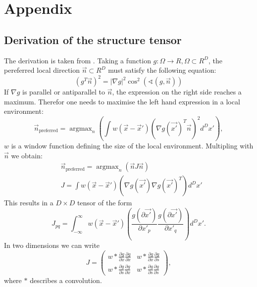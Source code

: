 \documentclass  [
  paper    = a4,
  BCOR     = 10mm,
  twoside,
  fontsize = 12pt,
  fleqn,
  toc      = bibnumbered,
  toc      = listofnumbered,
  numbers  = noendperiod,
  headings = normal,
  listof   = leveldown,
  version  = 3.03
]                                       {scrreprt}
\DeclareMathOperator*{\argmax}{argmax}
\begin{document}
  \part{Appendix}
  \begin{appendix}
  	\chapter{Derivation of the structure tensor}
  	The derivation is taken from \cite{jahne2013digitale}. Taking a function $g:\Omega\rightarrow \!R, \Omega \subset \!R^D$, the pereferred local direction $\vec{n} \subset \!R^D$ must satisfy the following equation:
  	\begin{equation}\label{key}
  	( g^T\vec{n})^2 = |\nabla g |^2 \cos^2(\sphericalangle (g, \vec{n}))
  	\end{equation}
  	If $\nabla g$ is parallel or antiparallel to $\vec{n}$, the expression on the right side reaches a maximum. Therefor one needs to maximise the left hand expression in a local environment:
  	\begin{equation}\label{key}
  	\vec n_\text{preferred} = \argmax_n\left(\int w(\vec x - \vec x')\left(\nabla g(\vec{x'})^T \vec{n}\right)^2d^Dx' \right),
  	\end{equation}
  	$w$ is a window function defining the size of the local environment. Multipling with $\vec{n}$
  	we obtain:
  	\begin{align}\label{key}
  	&\vec n_\text{preferred} = \argmax_n\left(\vec n  J \vec n \right)\\
  	& J = \int w(\vec x - \vec x')\left(\nabla g(\vec{x'}) \nabla g(\vec{x'})^T\right)d^Dx'
  	\end{align}
  	This results in a $D\times D $ tensor of the form
  	\begin{equation}\label{key}
  	J_{pq} = \int_{-\infty}^{\infty} w(\vec x - \vec x')\left(\frac{g(\partial\vec{x'})}{\partial x'_p} \frac{g(\partial\vec{x'})}{\partial x'_q}\right)d^Dx'.
  	\end{equation}
  	In two dimensions we can write
	\begin{equation}\label{key}
	J =\left(
	\begin{matrix}
	w*\frac{\partial g}{\partial x}\frac{\partial g}{\partial x} & w*\frac{\partial g}{\partial x}\frac{\partial g}{\partial s} \\
	w*\frac{\partial g}{\partial s}\frac{\partial g}{\partial x} & w*\frac{\partial g}{\partial s}\frac{\partial g}{\partial s} 
	\end{matrix}\right),
	\end{equation}  
	where \glqq $*$ \grqq describes a convolution.	
  	

\end{appendix}
\end{document}
